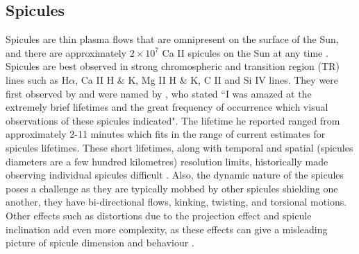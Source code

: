 \subsection{Spicules}
\label{subsec:Spicules}
Spicules are thin plasma flows that are omnipresent on the surface of the Sun, and there are approximately $2 \times 10^{7}$ Ca II spicules on the Sun at any time \citep{Judge_2010ApJ}. Spicules are best observed in strong chromospheric and transition region (TR) lines such as H$\alpha$, Ca II H \& K, Mg II H \& K, C II and Si IV lines. They were first observed by \cite{Secchi1877} and were named by \cite{Roberts1945ApJ}, who stated ``I was amazed at the extremely brief lifetimes and the great frequency of occurrence which visual observations of these spicules indicated". The lifetime he reported ranged from approximately 2-11 minutes which fits in the range of current estimates for spicules lifetimes. These short lifetimes, along with temporal and spatial (spicules diameters are a few hundred kilometres) resolution limits, historically made observing individual spicules difficult \citep{Sterling_2000SoPh}. Also, the dynamic nature of the spicules poses a challenge as they are typically mobbed by other spicules shielding one another, they have bi-directional flows, kinking, twisting, and torsional motions. Other effects such as distortions due to the projection effect and spicule inclination add even more complexity, as these effects can give a misleading picture of spicule dimension and behaviour \citep{Porfir2016A}. \np
%
